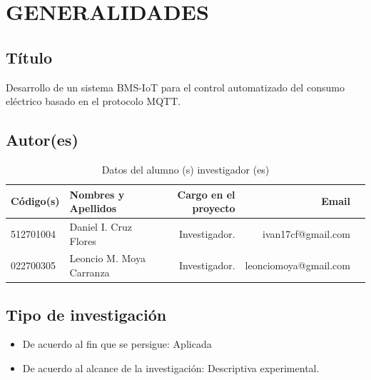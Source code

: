 \documentclass[a4paper, 12pt]{article}
\begin{document}
\section{GENERALIDADES}



\subsection{Título}
Desarrollo de un sistema BMS-IoT para el control automatizado del consumo eléctrico basado en el protocolo MQTT.

\subsection{Autor(es)}
\begin{table}[h!]
 \caption{\small{Datos del alumno (s) investigador (es)}}
\begin{tabular}{llrrr} \toprule
{\bf Código(s)} & {\bf Nombres y Apellidos} & {\bf Cargo en el proyecto} & {\bf Email} \\ \midrule
512701004 & Daniel I. Cruz Flores & Investigador. & ivan17cf@gmail.com \\
022700305    & Leoncio M. Moya Carranza & Investigador. & leonciomoya@gmail.com            \\ \bottomrule
\end{tabular}
\end{table}



\subsection{Tipo de investigación}

\begin{itemize}
\item De acuerdo al fin que se persigue: Aplicada 
\item De acuerdo al alcance de  la investigación: Descriptiva experimental.
\end{itemize}
\end{document}
